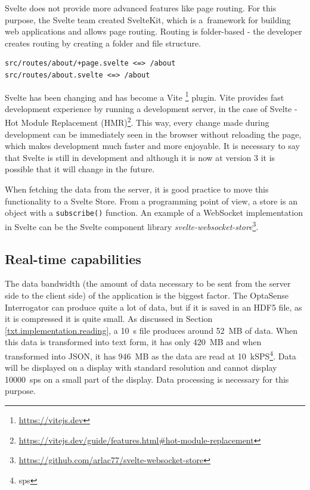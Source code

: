 Svelte does not provide more advanced features like page routing. For this purpose, the Svelte team created SvelteKit, which is a~framework for building web applications and allows page routing. Routing is folder-based - the developer creates routing by creating a folder and file structure.

\begin{verbatim}
src/routes/about/+page.svelte <=> /about
src/routes/about.svelte <=> /about
\end{verbatim}

Svelte has been changing and has become a Vite \footnote{\url{https://vitejs.dev}} plugin. Vite provides fast development experience by running a development server, in the case of Svelte - Hot Module Replacement (HMR)\footnote{\url{https://vitejs.dev/guide/features.html\#hot-module-replacement}}. This way, every change made during development can be immediately seen in the browser without reloading the page, which makes development much faster and more enjoyable. It is necessary to say that Svelte is still in development and although it is now at version 3 it is possible that it will change in the future. 

When fetching the data from the server, it is good practice to move this functionality to a Svelte Store. From a programming point of view, a store is an object with a \verb|subscribe()| function. An example of a WebSocket implementation in Svelte can be the Svelte component library \textit{svelte-websocket-store}\footnote{\url{https://github.com/arlac77/svelte-websocket-store}}.


\subsection{Real-time capabilities}\label{txt.design.frontend.realtime}

The data bandwidth (the amount of data necessary to be sent from the server side to the client side) of the application is the biggest factor. The OptaSense Interrogator can produce quite a lot of data, but if it is saved in an HDF5 file, as it is compressed it is quite small. As discussed in Section \ref{txt.implementation.reading}, a \qty{10}{\second} file produces around \qty{52}{MB} of data. When this data is transformed into text form, it has only \qty{420}{MB} and when transformed into JSON, it has \qty{946}{MB} as the data are read at  \qty{10}{kSPS}\footnote{\ac{sps}}. Data will be displayed on a display with standard resolution and cannot display \qty{10000}{\ac{sps}} on a small part of the display. Data processing is necessary for this purpose. 


